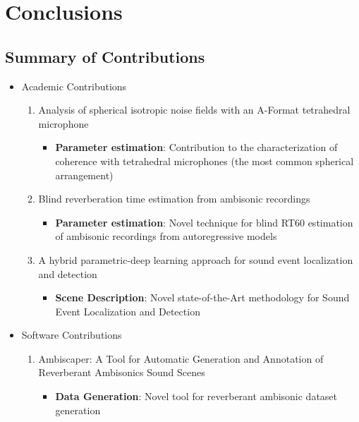 \chapter{Conclusions}


\section{Summary of Contributions}


\begin{itemize}
  \item Academic Contributions
  
  \begin{enumerate}
  	\item Analysis of spherical isotropic noise fields with an A-Format tetrahedral microphone 
  	\begin{itemize}
  		\item \textbf{Parameter estimation}: Contribution to the characterization of coherence with tetrahedral microphones (the most common spherical arrangement)
	\end{itemize}


  	\item Blind reverberation time estimation from ambisonic recordings 
  	\begin{itemize}
  		\item \textbf{Parameter estimation}: Novel technique for blind RT60 estimation of ambisonic recordings from autoregressive models
	\end{itemize}


  	\item A hybrid parametric-deep learning approach for sound event localization and detection 
  	\begin{itemize}
  		\item \textbf{Scene Description}: Novel state-of-the-Art methodology for Sound Event Localization and Detection	
  	\end{itemize}

  \end{enumerate}

  \item Software Contributions

	\begin{enumerate}
	
  		\item Ambiscaper: A Tool for Automatic Generation and Annotation of Reverberant Ambisonics Sound Scenes 
  		\begin{itemize}
  			\item \textbf{Data Generation}: Novel tool for reverberant ambisonic dataset generation
		\end{itemize}


\end{enumerate}
\end{itemize}
